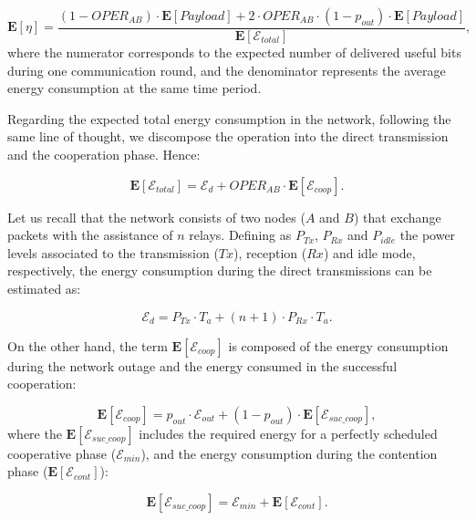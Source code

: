 \documentclass[12pt,draftcls, onecolumn]{IEEEtran}
\begin{document}
\begin{equation}
\label{eq:Eef}
 	\mathbf{E}[\eta]=\frac{(1-OPER_{AB})\cdot\mathbf{E}[Payload]+2\cdot OPER_{AB}\cdot(1-p_{out})\cdot\mathbf{E}[Payload]}{\mathbf{E}[\mathcal{E}_{total}]},
\end{equation}
where the numerator corresponds to the expected number of delivered useful bits during one communication round, and the denominator represents the average energy consumption at the same time period.

Regarding the expected total energy consumption in the network, following the same line of thought, we discompose the operation into the direct transmission and the cooperation phase. Hence:

\begin{equation}
\label{eq:Etotal}
 	\mathbf{E}[\mathcal{E}_{total}]=\mathcal{E}_{d}+OPER_{AB}\cdot \mathbf{E}[\mathcal{E}_{coop}].
\end{equation}

Let us recall that the network consists of two nodes ($A$ and $B$) that exchange packets with the assistance of $n$ relays. Defining as $P_{Tx}$, $P_{Rx}$ and $P_{idle}$ the power levels associated to the transmission ($Tx$), reception ($Rx$) and idle mode, respectively, the energy consumption during the direct transmissions can be estimated as:

\begin{equation}
\label{eq:Ed}
 	\mathcal{E}_{d}=P_{Tx}\cdot T_a+(n+1)\cdot P_{Rx}\cdot T_a.
\end{equation}

On the other hand, the term $\mathbf{E}[\mathcal{E}_{coop}]$ is composed of the energy consumption during the network outage and the energy consumed in the successful cooperation:

\begin{equation}
\label{eq:Ecoop}
 	\mathbf{E}[\mathcal{E}_{coop}]=p_{out}\cdot \mathcal{E}_{out}+(1-p_{out})\cdot \mathbf{E}[\mathcal{E}_{suc\_coop}],
\end{equation}
where the $\mathbf{E}[\mathcal{E}_{suc\_coop}]$ includes the required energy for a perfectly scheduled cooperative phase ($\mathcal{E}_{min}$), and the energy consumption during the contention phase ($\mathbf{E}[\mathcal{E}_{cont}]$):

\begin{equation}
\label{eq:Ecoop}
 	\mathbf{E}[\mathcal{E}_{suc\_coop}]=\mathcal{E}_{min}+\mathbf{E}[\mathcal{E}_{cont}].
\end{equation}
\end{document}
